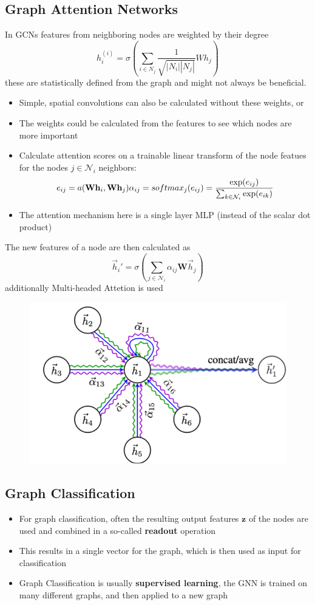 \subsection{Graph Attention Networks}
In GCNs features from neighboring nodes are weighted by their degree
\[
h_i^{(i)} = \sigma \left(\sum_{i \in N_j}\frac{1}{\sqrt{|N_i||N_j|}}Wh_j\right)
\]
these are statistically defined from the graph and might not always be beneficial.
\begin{itemize}
    \item Simple, spatial convolutions can also be calculated without these weights, or
    \item The weights could be calculated from the features to see which nodes are more important
    \item Calculate attention scores on a trainable linear transform of the node featues for the nodes \(j \in \mathcal{N}_i\) neighbors:
    \[
    e_{ij} = a(\mathbf{Wh}_i,\mathbf{Wh}_j)\\
    \alpha_{ij} = softmax_j(e_{ij}) = \frac{\text{exp}(e_{ij})}{\sum_{k\in\mathcal{N}_i}\text{exp}(e_{ik})}
    \]
     \item The attention mechanism here is a single layer MLP (instead of the scalar dot product)
\end{itemize} 
The new features of a node are then calculated as 
\[
\vec{h}_i' = \sigma \left(\sum_{j \in \mathcal{N}_i} \alpha_{ij}\mathbf{W}\vec{h}_j\right)
\]
additionally Multi-headed Attetion is used
\begin{figure}[h!]
    \includegraphics[width = 0.5\columnwidth]{figures/GraphNeuralNetworks2/GraphAttentionNetworks.png}
\end{figure}

\subsection{Graph Classification}
\begin{itemize}
    \item For graph classification, often the resulting output features \(\mathbf{z}\) of the nodes are used and combined in a so-called \textbf{readout} operation
    \item This results in a single vector for the graph, which is then used as input for classification
    \item Graph Classification is usually \textbf{supervised learning}, the GNN is trained on many different graphs, and then applied to a new graph
\end{itemize}

